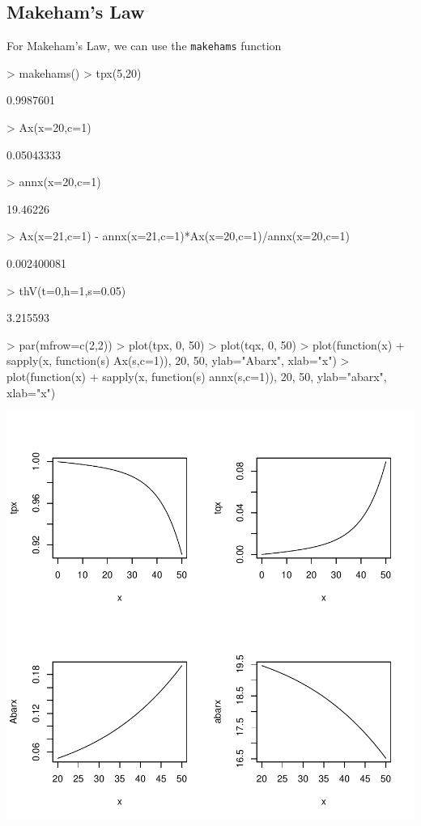 \documentclass[12pt]{article}
\begin{document}
\subsection{Makeham's Law}
For Makeham's Law, we can use the \texttt{makehams} function
\begin{Schunk}
\begin{Sinput}
> makehams()
> tpx(5,20)
\end{Sinput}
\begin{Soutput}
[1] 0.9987601
\end{Soutput}
\begin{Sinput}
> Ax(x=20,c=1)
\end{Sinput}
\begin{Soutput}
[1] 0.05043333
\end{Soutput}
\begin{Sinput}
> annx(x=20,c=1)
\end{Sinput}
\begin{Soutput}
[1] 19.46226
\end{Soutput}
\begin{Sinput}
> Ax(x=21,c=1) - annx(x=21,c=1)*Ax(x=20,c=1)/annx(x=20,c=1)
\end{Sinput}
\begin{Soutput}
[1] 0.002400081
\end{Soutput}
\begin{Sinput}
> thV(t=0,h=1,s=0.05)
\end{Sinput}
\begin{Soutput}
[1] 3.215593
\end{Soutput}
\begin{Sinput}
> par(mfrow=c(2,2))
> plot(tpx, 0, 50)
> plot(tqx, 0, 50)
> plot(function(x) 
+   sapply(x, function(s) Ax(s,c=1)), 20, 50, ylab="Abarx", xlab="x")
> plot(function(x) 
+   sapply(x, function(s) annx(s,c=1)), 20, 50, ylab="abarx", xlab="x")
\end{Sinput}
\end{Schunk}
\includegraphics{survivalModels-003}
\end{document}
